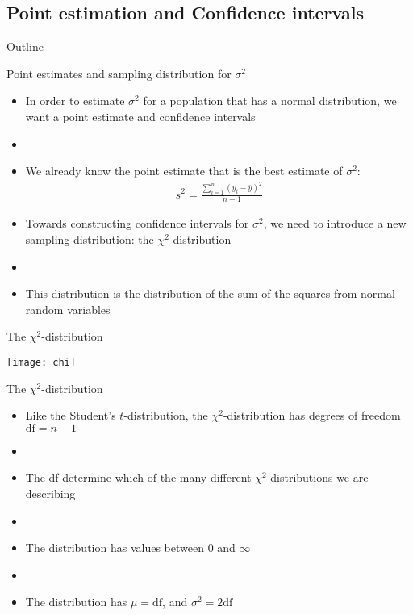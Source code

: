 \documentclass[xcolor=dvipsnames]{beamer}
\begin{document}
\subsection{Point estimation and Confidence intervals}
\begin{frame}{Outline}
	\tableofcontents[currentsection,subsectionstyle=show/shaded/hide]
\end{frame}


\begin{frame}{Point estimates and sampling distribution for $\sigma^2$}
	\begin{itemize}
		\item In order to estimate $\sigma^2$ for a population that has a normal distribution, we want a point estimate and confidence intervals \pause
		\item[]
		\item We already know the point estimate that is the best estimate of $\sigma^2$: \pause
		\begin{gather*}
			s^2=\frac{\sum_{i=1}^{n}(y_i-\bar{y})^2}{n-1}
		\end{gather*} \pause
		\item Towards constructing confidence intervals for $\sigma^2$, we need to introduce a new sampling distribution: the $\chi^2$-distribution \pause
		\item[]
		\item This distribution is the distribution of the sum of the squares from normal random variables
	\end{itemize}
\end{frame}

\begin{frame}{The  $\chi^2$-distribution}
	\begin{center}
		\texttt{[image: chi]}
	\end{center}
\end{frame}

\begin{frame}{The  $\chi^2$-distribution }
	\begin{itemize}
		\item Like the Student's $t$-distribution, the $\chi^2$-distribution has degrees of freedom $\text{df}=n-1$ \pause
		\item[]
		\item The df determine which of the many different $\chi^2$-distributions we are describing \pause
		\item[]
		\item The distribution has values between $0$ and $\infty$ \pause
		\item[]
		\item The distribution has $\mu = \text{df}$, and $\sigma^2 = 2\text{df}$
	\end{itemize}
\end{frame}
\end{document}
